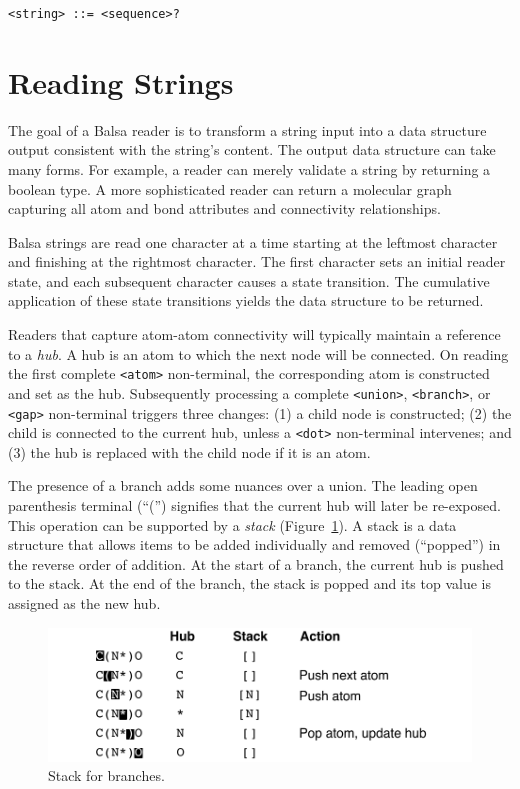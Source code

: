 \documentclass{article}
\def\ttt{\texttt}
\begin{document}
\begin{lstlisting}
<string> ::= <sequence>?
\end{lstlisting}

\section*{Reading Strings}
\label{reading-strings}

The goal of a Balsa reader is to transform a string input into a data structure output consistent with the string's content. The output data structure can take many forms. For example, a reader can merely validate a string by returning a boolean type. A more sophisticated reader can return a molecular graph capturing all atom and bond attributes and connectivity relationships.

Balsa strings are read one character at a time starting at the leftmost character and finishing at the rightmost character. The first character sets an initial reader state, and each subsequent character causes a state transition. The cumulative application of these state transitions yields the data structure to be returned.

Readers that capture atom-atom connectivity will typically maintain a reference to a \textit{hub}. A hub is an atom to which the next node will be connected. On reading the first complete \ttt{<atom>} non-terminal, the corresponding atom is constructed and set as the hub. Subsequently processing a complete \ttt{<union>}, \ttt{<branch>}, or \ttt{<gap>} non-terminal triggers three changes: (1) a child node is constructed; (2) the child is connected to the current hub, unless a \ttt{<dot>} non-terminal intervenes; and (3) the hub is replaced with the child node if it is an atom.

The presence of a branch adds some nuances over a union. The leading open parenthesis terminal (\enquote{(}) signifies that the current hub will later be re-exposed. This operation can be supported by a \textit{stack} (Figure~\ref{fig:stack}). A stack is a data structure that allows items to be added individually and removed (\enquote{popped}) in the reverse order of addition. At the start of a branch, the current hub is pushed to the stack. At the end of the branch, the stack is popped and its top value is assigned as the new hub.

\begin{figure}
    \centering
    \includegraphics[width=\columnwidth]{stack.pdf}
    \caption{Stack for branches.}
    \label{fig:stack}
\end{figure}
\end{document}
